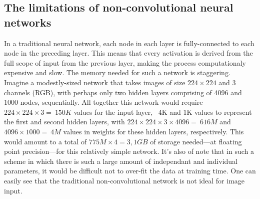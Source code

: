 \subsection{The limitations of non-convolutional neural networks}
In a traditional neural network, each node in each layer is fully-connected to each node in the preceding layer. This means that every activation is derived from the full scope of input from the previous layer, making the process computationaly expensive and slow. The memory needed for such a network is staggering. Imagine a modestly-sized network that takes images of size $224\times224$ and 3 channels (RGB), with perhaps only two hidden layers comprising of 4096 and 1000 nodes, sequentially. All together this network would require $224\times224\times3 = ~150K$ values for the input layer, ~4K  and 1K values to represent the first and second hidden layers, with $224\times224\times3\times4096 = ~616M$ and $4096\times1000 = ~4M$ values in weights for these hidden layers, respectively. This would amount to a total of $775M\times4 = 3,1 GB$ of storage needed---at floating point precision---for this relatively simple network. It's also of note that in such a scheme in which there is such a large amount of independant and individual parameters, it would be difficult not to over-fit the data at training time. One can easily see that the traditional non-convolutional network is not ideal for image input.

\label{fig:nn}


